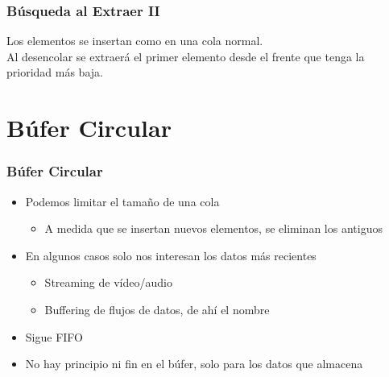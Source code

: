 \documentclass[11pt]{beamer}
\begin{document}
\begin{frame}\frametitle{Búsqueda al Extraer II}
\begin{block}{}
Los elementos se insertan como en una cola normal. \\
Al desencolar se extraerá el primer elemento desde el frente que tenga la prioridad más baja.
\end{block}
\vspace{0.4cm}
\begin{center}
\end{center}
\end{frame}


\section{Búfer Circular}

\begin{frame}\frametitle{Búfer Circular}
\begin{itemize}
\item Podemos limitar el tamaño de una cola
    \begin{itemize}
    \item A medida que se insertan nuevos elementos, se eliminan los antiguos
    \end{itemize}
\item En algunos casos solo nos interesan los datos más recientes
    \begin{itemize}
    \item Streaming de vídeo/audio
    \item Buffering de flujos de datos, de ahí el nombre
    \end{itemize}
\item Sigue FIFO
\item No hay principio ni fin en el búfer, solo para los datos que almacena
\end{itemize}
\end{frame}
\end{document}
